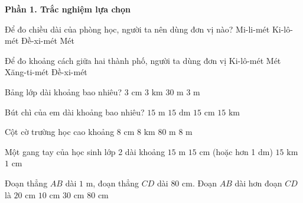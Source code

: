 \textbf{Phần 1. Trắc nghiệm lựa chọn}

\begin{ex} %
Để đo chiều dài của phòng học, người ta nên dùng đơn vị nào?
\choice
{Mi-li-mét}
{Ki-lô-mét}
{Đề-xi-mét}
{\True Mét}
\end{ex}

\begin{ex} %
Để đo khoảng cách giữa hai thành phố, người ta dùng đơn vị
\choice
{\True Ki-lô-mét}
{Mét}
{Xăng-ti-mét}
{Đề-xi-mét}
\end{ex}

\begin{ex} %
Bảng lớp dài khoảng bao nhiêu?
\choice
{$3\text{ cm}$}
{$3\text{ km}$}
{$30\text{ m}$}
{\True $3\text{ m}$}
\end{ex}

\begin{ex} %
Bút chì của em dài khoảng bao nhiêu?
\choice
{$15\text{ m}$}
{$15\text{ dm}$}
{\True $15\text{ cm}$}
{$15\text{ km}$}
\end{ex}

\begin{ex} %
Cột cờ trường học cao khoảng
\choice
{$8\text{ cm}$}
{$8\text{ km}$}
{$80\text{ m}$}
{\True $8\text{ m}$}
\end{ex}

\begin{ex} %
Một gang tay của học sinh lớp 2 dài khoảng
\choice
{$15\text{ m}$}
{\True $15\text{ cm}$ (hoặc hơn 1 dm)}
{$15\text{ km}$}
{$1\text{ cm}$}
\end{ex}

\begin{ex} %
Đoạn thẳng $AB$ dài $1\text{ m}$, đoạn thẳng $CD$ dài $80\text{ cm}$. Đoạn $AB$ dài hơn đoạn $CD$ là
\choice
{\True $20\text{ cm}$}
{$10\text{ cm}$}
{$30\text{ cm}$}
{$80\text{ cm}$}
\end{ex}

